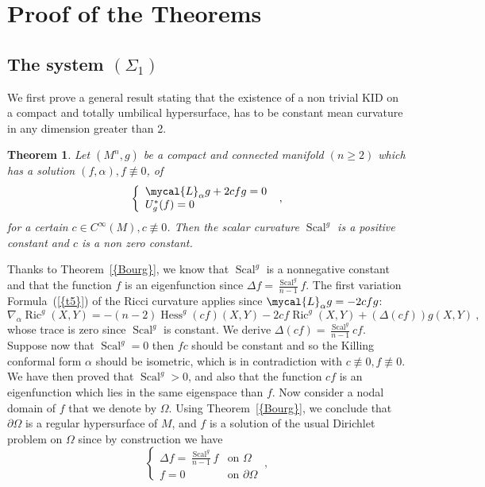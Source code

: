 \documentclass[a4paper,11pt,leqno]{amsart}
\numberwithin{equation}{section}
\theoremstyle{main}
\newtheorem{thm} {\bf  Theorem} [section]
\begin{document}
\section{Proof of the Theorems}\label{preuves}

\subsection{The system $(\Sigma_1)$} We first prove a general result stating that the existence of a non trivial KID on a compact and totally umbilical hypersurface, has to be constant mean curvature in any dimension greater than 2.

\begin{thm}\label{cmc}
	Let  $(M^n, g)$ be a compact and connected manifold $(n\ge2)$ which has a solution $(f,\alpha), f\not \equiv 0$, of
$$ \left\{
\begin{array}{l}
	 \mycal{L}_\alpha g+ 2cfg= 0 \\
	 U_g^* (f)=0
\end{array}\right. \ ,$$
for a certain $c\in C^{\infty}(M), c\not\equiv 0$. Then the scalar curvature ${\operatorname{Scal}}^g$ is a positive constant and $c$ is a non zero constant.
\end{thm}
\proof Thanks to Theorem~{\ref{{Bourg}}}, we know that ${\operatorname{Scal}}^g$ is a nonnegative constant and that the function $f$ is an eigenfunction since $\Delta f=\frac{{\operatorname{Scal}}^g}{n-1}f$. The first variation Formula~({\ref{{t5}}}) of the Ricci curvature applies since $\mycal{L}_\alpha g=- 2cfg$:
$$ \nabla_\alpha {\operatorname{Ric}}^g (X,Y)= -(n-2){\operatorname{Hess}}^g (cf)(X,Y) - 2cf {\operatorname{Ric}}^g (X,Y) + (\Delta (cf))g(X,Y) \ ,$$
whose trace is zero since ${\operatorname{Scal}}^g$ is constant. We derive $\Delta (cf)=\frac{{\operatorname{Scal}}^g}{n-1}cf$. Suppose now that ${\operatorname{Scal}}^g=0$ then $fc$ should be constant and so the Killing conformal form $\alpha$ should be isometric, which is in contradiction with $c\not\equiv0, f\not \equiv0$. We have then proved that ${\operatorname{Scal}}^g>0$, and also that the function $cf$ is an eigenfunction which lies in the same eigenspace than $f$. Now consider a nodal domain of $f$ that we denote by $\Omega$. Using Theorem~{\ref{{Bourg}}}, we conclude that $\partial\Omega$ is a regular hypersurface of $M$, and $f$ is a solution of the usual Dirichlet problem on $\Omega$ since by construction we have 
$$\left\{
\begin{array}{cl}
	\Delta f=\frac{{\operatorname{Scal}}^g}{n-1}f& \textrm{on } \Omega  \\
	f=0 & \textrm{on } \partial\Omega
\end{array}\right. \ ,$$
\end{document}
